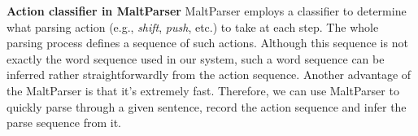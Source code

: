\textbf{Action classifier in MaltParser }MaltParser employs a
classifier to determine what parsing action (e.g.,
{\em shift}, {\em push}, etc.) to take at each step. The whole parsing
process defines a sequence of such actions. Although this sequence is
not exactly the word sequence used in our system, such a word sequence
can be inferred rather straightforwardly from the action sequence.
Another advantage of
the MaltParser is that it's extremely fast. Therefore, we can use MaltParser
to quickly parse through a given sentence, record the action sequence and
infer the parse sequence from it.

%


%

